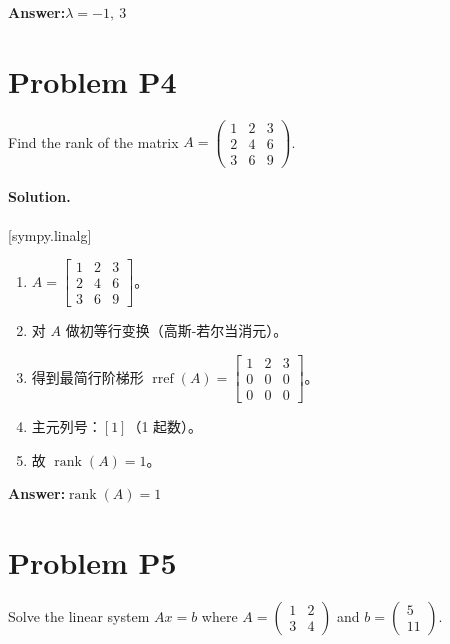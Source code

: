 \documentclass[11pt,a4paper]{ctexart}
\newcommand{\solvertag}[1]{{\footnotesize\color{gray}\textsf{[#1]}}}
\begin{document}
\noindent\textbf{Answer:}\quad $\lambda = -1,\ 3$

\medskip

\section*{Problem P4}
Find the rank of the matrix $A = \begin{pmatrix} 1 & 2 & 3 \\ 2 & 4 & 6 \\ 3 & 6 & 9 \end{pmatrix}$.

\paragraph{Solution.} \solvertag{sympy.linalg} 

\begin{enumerate}[leftmargin=*]
  \item $A = \left[\begin{matrix}1 & 2 & 3\\2 & 4 & 6\\3 & 6 & 9\end{matrix}\right]$。
  \item 对 $A$ 做初等行变换（高斯-若尔当消元）。
  \item 得到最简行阶梯形 $\operatorname{rref}(A) = \left[\begin{matrix}1 & 2 & 3\\0 & 0 & 0\\0 & 0 & 0\end{matrix}\right]$。
  \item 主元列号：$[1]$（1 起数）。
  \item 故 $\operatorname{rank}(A) = 1$。
\end{enumerate}

\noindent\textbf{Answer:}\quad $\operatorname{rank}(A) = 1$

\medskip

\section*{Problem P5}
Solve the linear system $Ax = b$ where $A = \begin{pmatrix} 1 & 2 \\ 3 & 4 \end{pmatrix}$ and $b = \begin{pmatrix} 5 \\ 11 \end{pmatrix}$.
\end{document}
